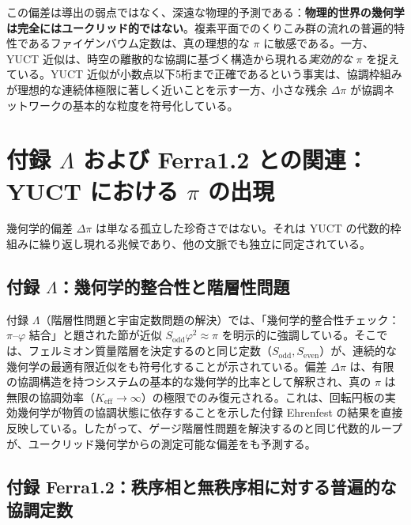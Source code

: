 \documentclass[11pt,a4paper]{article}
\begin{document}
	この偏差は導出の弱点ではなく、深遠な物理的予測である：\textbf{物理的世界の幾何学は完全にはユークリッド的ではない}。複素平面でのくりこみ群の流れの普遍的特性であるファイゲンバウム定数は、真の理想的な \(\pi\) に敏感である。一方、YUCT 近似は、時空の離散的な協調に基づく構造から現れる\textit{実効的な} \(\pi\) を捉えている。YUCT 近似が小数点以下5桁まで正確であるという事実は、協調枠組みが理想的な連続体極限に著しく近いことを示す一方、小さな残余 \(\Delta\pi\) が協調ネットワークの基本的な粒度を符号化している。
	
	\section{付録 \(\Lambda\) および Ferra1.2 との関連：YUCT における \(\pi\) の出現}
	
	幾何学的偏差 \(\Delta\pi\) は単なる孤立した珍奇さではない。それは YUCT の代数的枠組みに繰り返し現れる兆候であり、他の文脈でも独立に同定されている。
	
	\subsection{付録 \(\Lambda\)：幾何学的整合性と階層性問題}
	
	付録 \(\Lambda\)（階層性問題と宇宙定数問題の解決）では、「幾何学的整合性チェック：\(\pi\)–\(\varphi\) 結合」と題された節が近似 \(S_{\mathrm{odd}}\varphi^2 \approx \pi\) を明示的に強調している。そこでは、フェルミオン質量階層を決定するのと同じ定数（\(S_{\mathrm{odd}}, S_{\mathrm{even}}\)）が、連続的な幾何学の最適有限近似をも符号化することが示されている。偏差 \(\Delta\pi\) は、有限の協調構造を持つシステムの基本的な幾何学的比率として解釈され、真の \(\pi\) は無限の協調効率（\(K_{\mathrm{eff}} \to \infty\)）の極限でのみ復元される。これは、回転円板の実効幾何学が物質の協調状態に依存することを示した付録 Ehrenfest の結果を直接反映している。したがって、ゲージ階層性問題を解決するのと同じ代数的ループが、ユークリッド幾何学からの測定可能な偏差をも予測する。
	
	\subsection{付録 Ferra1.2：秩序相と無秩序相に対する普遍的な協調定数}
	
\end{document}
